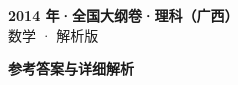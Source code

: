 \documentclass[zihao=-4, a4paper]{ctexart}
\begin{document}
\begin{center}
  {\Large\bfseries 2014 年·全国大纲卷·理科（广西）}\\[4pt]
  {\large 数学 · 解析版}
\end{center}
\medskip
{}

\clearpage
{}
\begin{center}{\Large\bfseries 参考答案与详细解析}\end{center}
\medskip

\end{document}
